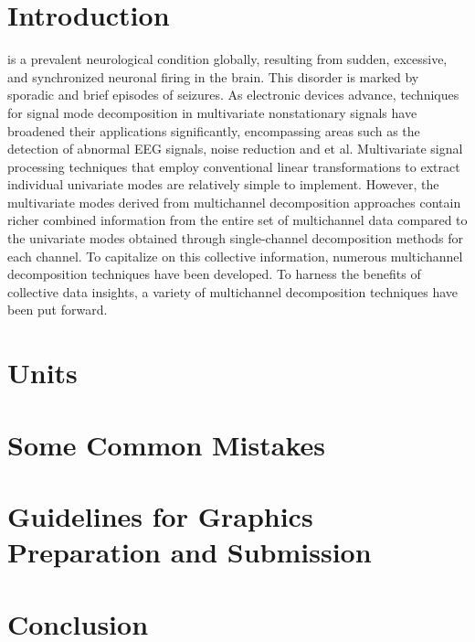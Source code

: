 \documentclass[journal,twoside,web]{ieeecolor2}
\begin{document}
\section{Introduction}
\label{sec:introduction}
 is a prevalent neurological condition globally, resulting from sudden, excessive, and synchronized neuronal firing in the brain\cite{wu_Novel_2024}. This disorder is marked by sporadic and brief episodes of seizures\cite{kim2020epileptic}. As electronic devices advance, techniques for signal mode decomposition in multivariate nonstationary signals have broadened their applications significantly\cite{stankovic2020decomposition}, encompassing areas such as the detection of abnormal EEG signals\cite{ala2022alpha}, noise reduction\cite{stankovic2018time} and et al. Multivariate signal processing techniques that employ conventional linear transformations to extract individual univariate modes are relatively simple to implement. However, the multivariate modes derived from multichannel decomposition approaches contain richer combined information from the entire set of multichannel data compared to the univariate modes obtained through single-channel decomposition methods for each channel. To capitalize on this collective information, numerous multichannel decomposition techniques have been developed. To harness the benefits of collective data insights, a variety of multichannel decomposition techniques have been put forward.



\section{Units}


\section{Some Common Mistakes}


\section{Guidelines for Graphics Preparation and Submission}
\label{sec:guidelines}



\section{Conclusion}
 

    
\end{document}
